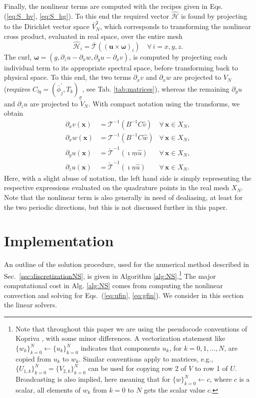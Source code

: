 \documentclass[preprint]{elsarticle}
\newcommand{\N}[1]{\check{#1}}
\newcommand{\D}[1]{\bar{#1}}
\begin{document}
Finally, the nonlinear
terms are computed with the recipes given in Eqs. (\ref{eq:S_hv}, \ref{eq:S_hg}). To this end the required vector $\bm{\hat{\mathcal{H}}}$ is found by projecting to the Dirichlet vector space $\D{V}_N^3$, which corresponds to transforming the nonlinear cross product, evaluated in real space, over the entire mesh
\begin{equation}
{\hat{\mathcal{H}}}_i = \mathcal{\D{T}}((\bm{u} \times \bm{\omega})_i) \quad \forall \, i=x,y,z. \label{eq:H_hat}
\end{equation}
The curl, $\bm{\omega} = (g, \partial_z u - \partial_x w, \partial_y u - 
\partial_x v)$, is computed by projecting each individual term to its appropriate spectral space, before transforming back to physical space. 
To this end, the two terms $\partial_x v$ and $\partial_x w$ are projected to 
$V_N$ (requires $C_{lq} = (\D{\phi}_j^{'}, T_k)_{\sigma}$, see Tab. \ref{tab:matrices}), whereas the remaining $\partial_y u$ and $\partial_z u$ are projected to 
$\N{V}_N$. With compact notation using the transforms, we obtain
\begin{align}
\partial_x v(\bm{x}) &= \mathcal{T}^{-1}(B^{-1}C\hat{v}) &\forall \, \bm{x} \in X_N, \\
\partial_x w(\bm{x}) &= \mathcal{T}^{-1}(B^{-1}C\hat{w}) &\forall \, \bm{x} \in X_N, \\
\partial_y u(\bm{x}) &= \N{\mathcal{T}}^{-1}(\imath \underline{m}\hat{u}) &\forall \, \bm{x} \in X_N, \\
\partial_z u(\bm{x}) &= \N{\mathcal{T}}^{-1}(\imath \underline{n}\hat{u}) &\forall \, \bm{x} \in X_N.
\end{align}
Here, with a slight abuse of notation, the left hand side is simply representing the respective expressions evaluated on the quadrature points in the real mesh $X_N$. 
Note that the nonlinear term is also generally in need of 
dealiasing, at least for the two periodic directions, but this is not discussed further in this paper.

\section{Implementation}
\label{sec:implementation}
An outline of the solution procedure, used for the numerical method described 
in Sec.~\ref{sec:discretizationNS}, is given in Algorithm 
\ref{alg:NS}.\footnote{Note that throughout this paper we are using the 
pseudocode conventions of Kopriva \cite{kopriva09}, with some minor differences. 
A vectorization statement like $\{w_k\}_{k=0}^{N} \gets \{u_k\}_{k=0}^N$ indicates that components $u_k$, for $k=0,1,\ldots,N$, are copied from 
$u_k$ to $w_k$. Similar conventions apply to matrices, e.g., 
$\{U_{1,k}\}_{k=0}^N = \{V_{2,k}\}_{k=0}^N$ can be used for copying row 2 of 
$V$ to row 1 of $U$. Broadcasting is also implied, here meaning that for $\{w\}_{k=0}^{N} \gets c$, where $c$ is a scalar, all elements of $w_k$ from $k=0$ to $N$ gets the scalar value $c$.} The major computational cost in Alg. \ref{alg:NS} comes from  computing the 
nonlinear convection and solving for Eqs.~(\ref{eq:ufin}, \ref{eq:gfin}). We consider in this section the linear solvers.
\end{document}
